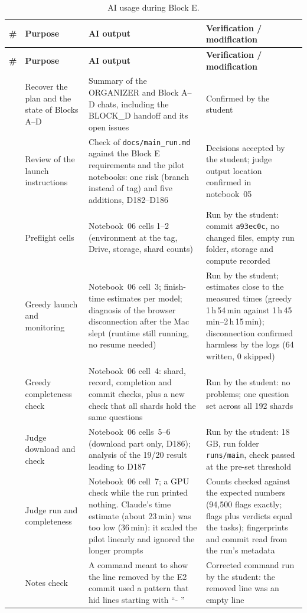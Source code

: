 \documentclass[11pt,a4paper]{report}
\begin{document}
{\small
\renewcommand{\arraystretch}{1.25}
\begin{longtable}{
  >{\raggedright\arraybackslash}p{0.6cm}
  >{\raggedright\arraybackslash}p{4.4cm}
  >{\raggedright\arraybackslash}p{4.4cm}
  >{\raggedright\arraybackslash}p{4.8cm}}
\caption{AI usage during Block E.}\label{tab:ailog-e}\\
\toprule
\textbf{\#} & \textbf{Purpose} & \textbf{AI output} & \textbf{Verification / modification} \\
\midrule
\endfirsthead
\toprule
\textbf{\#} & \textbf{Purpose} & \textbf{AI output} & \textbf{Verification / modification} \\
\midrule
\endhead
\bottomrule
\endfoot
102 & Recover the plan and the state of Blocks A--D
  & Summary of the ORGANIZER and Block A--D chats, including the BLOCK\_D handoff and its open issues
  & Confirmed by the student \\
103 & Review of the launch instructions
  & Check of \texttt{docs/main\_run.md} against the Block E requirements and the pilot notebooks: one risk (branch instead of tag) and five additions, D182--D186
  & Decisions accepted by the student; judge output location confirmed in notebook~05 \\
104 & Preflight cells
  & Notebook~06 cells 1--2 (environment at the tag, Drive, storage, shard counts)
  & Run by the student: commit \texttt{a93ec0c}, no changed files, empty run folder, storage and compute recorded \\



105 & Greedy launch and monitoring
  & Notebook~06 cell~3; finish-time estimates per model; diagnosis of the browser disconnection after the Mac slept (runtime still running, no resume needed)
  & Run by the student; estimates close to the measured times (greedy 1\,h\,54\,min against 1\,h\,45\,min--2\,h\,15\,min); disconnection confirmed harmless by the logs (64 written, 0 skipped) \\
106 & Greedy completeness check
  & Notebook~06 cell~4: shard, record, completion and commit checks, plus a new check that all shards hold the same questions
  & Run by the student: no problems; one question set across all 192 shards \\
107 & Judge download and check
  & Notebook~06 cells~5--6 (download part only, D186); analysis of the 19/20 result leading to D187
  & Run by the student: 18\,GB, run folder \texttt{runs/main}, check passed at the pre-set threshold \\
108 & Judge run and completeness
  & Notebook~06 cell~7; a GPU check while the run printed nothing. Claude's time estimate (about 23\,min) was too low (36\,min): it scaled the pilot linearly and ignored the longer prompts
  & Counts checked against the expected numbers (94{,}500 flags exactly; flags plus verdicts equal the tasks); fingerprints and commit read from the run's metadata \\
109 & Notes check
  & A command meant to show the line removed by the E2 commit used a pattern that hid lines starting with ``- ''
  & Corrected command run by the student: the removed line was an empty line \\


\end{longtable}}
\end{document}
